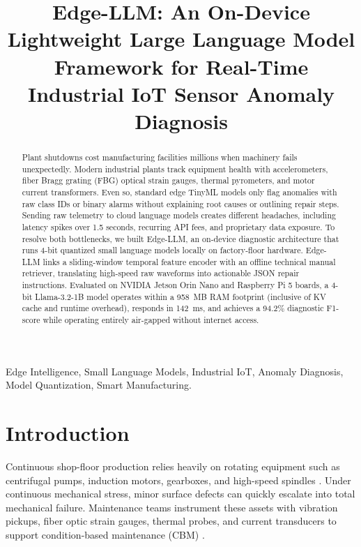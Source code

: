 \documentclass[conference]{IEEEtran}
\begin{document}
\title{Edge-LLM: An On-Device Lightweight Large Language Model Framework for Real-Time Industrial IoT Sensor Anomaly Diagnosis}

\author{
}

\maketitle

\begin{abstract}
Plant shutdowns cost manufacturing facilities millions when machinery fails unexpectedly. Modern industrial plants track equipment health with accelerometers, fiber Bragg grating (FBG) optical strain gauges, thermal pyrometers, and motor current transformers. Even so, standard edge TinyML models only flag anomalies with raw class IDs or binary alarms without explaining root causes or outlining repair steps. Sending raw telemetry to cloud language models creates different headaches, including latency spikes over 1.5 seconds, recurring API fees, and proprietary data exposure. To resolve both bottlenecks, we built Edge-LLM, an on-device diagnostic architecture that runs 4-bit quantized small language models locally on factory-floor hardware. Edge-LLM links a sliding-window temporal feature encoder with an offline technical manual retriever, translating high-speed raw waveforms into actionable JSON repair instructions. Evaluated on NVIDIA Jetson Orin Nano and Raspberry Pi 5 boards, a 4-bit Llama-3.2-1B model operates within a 958~MB RAM footprint (inclusive of KV cache and runtime overhead), responds in 142~ms, and achieves a 94.2\% diagnostic F1-score while operating entirely air-gapped without internet access.
\end{abstract}

\begin{IEEEkeywords}
Edge Intelligence, Small Language Models, Industrial IoT, Anomaly Diagnosis, Model Quantization, Smart Manufacturing.
\end{IEEEkeywords}

\section{Introduction}
Continuous shop-floor production relies heavily on rotating equipment such as centrifugal pumps, induction motors, gearboxes, and high-speed spindles \cite{zhou2019edge, saxena2008damage}. Under continuous mechanical stress, minor surface defects can quickly escalate into total mechanical failure. Maintenance teams instrument these assets with vibration pickups, fiber optic strain gauges, thermal probes, and current transducers to support condition-based maintenance (CBM) \cite{zhou2019edge, saxena2008damage}.
\end{document}
